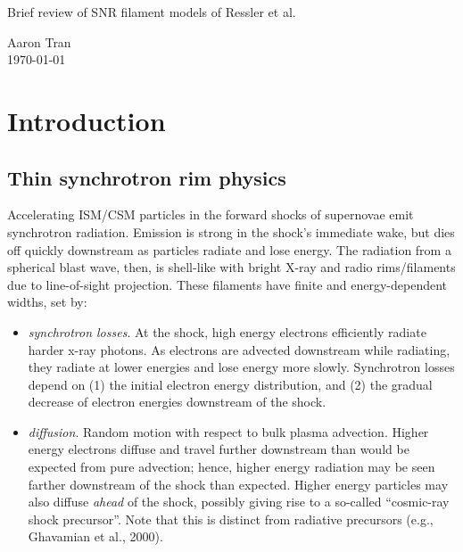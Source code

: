 \documentclass[10pt]{article}
\begin{document}
\begin{center}
    \Large{Brief review of SNR filament models of Ressler et al.}

    \normalsize{Aaron Tran}\\
    \today \\
\end{center}

\section{Introduction}

\subsection{Thin synchrotron rim physics}

Accelerating ISM/CSM particles in the forward shocks of supernovae emit
synchrotron radiation.  Emission is strong in the shock's immediate wake, but
dies off quickly downstream as particles radiate and lose energy. The radiation
from a spherical blast wave, then, is shell-like with bright X-ray and radio
rims/filaments due to line-of-sight projection.  These filaments have finite
and energy-dependent widths, set by:
\begin{itemize}
  \item \emph{synchrotron losses}.  At the shock, high energy electrons
  efficiently radiate harder x-ray photons.  As electrons are advected
  downstream while radiating, they radiate at lower energies and lose energy
  more slowly.  Synchrotron losses depend on (1) the initial electron energy
  distribution, and (2) the gradual decrease of electron energies downstream of
  the shock.
  \item \emph{diffusion}.  Random motion with respect to bulk plasma advection.
  Higher energy electrons diffuse and travel further downstream than would be
  expected from pure advection; hence, higher energy radiation may be seen
  farther downstream of the shock than expected.
  Higher energy particles may also diffuse \emph{ahead} of the shock, possibly
  giving rise to a so-called ``cosmic-ray shock precursor''.  Note that this is
  distinct from radiative precursors (e.g., Ghavamian et al., 2000).
\end{itemize}
\end{document}
